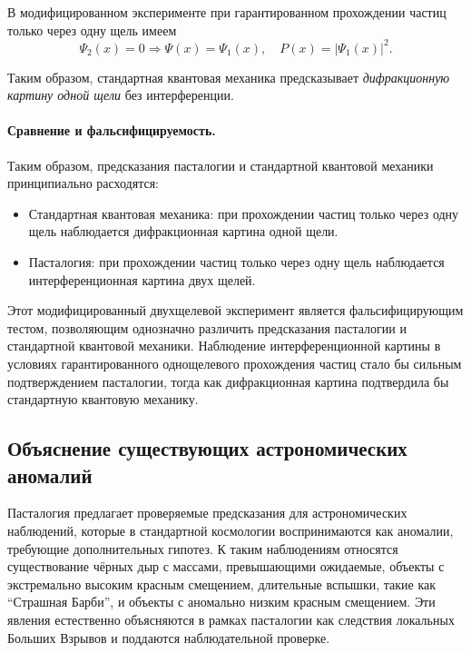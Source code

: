 \documentclass[pdflatex,sn-mathphys-num]{sn-jnl}
\begin{document}
В модифицированном эксперименте при гарантированном прохождении частиц только через одну щель имеем
\begin{equation}
    \Psi_2(x) = 0 \Rightarrow \Psi(x) = \Psi_1(x), \quad P(x) = |\Psi_1(x)|^2.
\end{equation}

Таким образом, стандартная квантовая механика предсказывает \emph{дифракционную картину одной щели} без интерференции.

\paragraph{Сравнение и фальсифицируемость.} Таким образом, предсказания пасталогии и стандартной квантовой механики принципиально расходятся:
\begin{itemize}
    \item Стандартная квантовая механика: при прохождении частиц только через одну щель наблюдается дифракционная картина одной щели.
    \item Пасталогия: при прохождении частиц только через одну щель наблюдается интерференционная картина двух щелей.
\end{itemize}
Этот модифицированный двухщелевой эксперимент является фальсифицирующим тестом, позволяющим однозначно различить предсказания пасталогии и стандартной квантовой механики. Наблюдение интерференционной картины в условиях гарантированного однощелевого прохождения частиц стало бы сильным подтверждением пасталогии, тогда как дифракционная картина подтвердила бы стандартную квантовую механику.

\subsection{Объяснение существующих астрономических аномалий}\label{subsec:astronomical-anomalies}

Пасталогия предлагает проверяемые предсказания для астрономических наблюдений, которые в стандартной космологии воспринимаются как аномалии, требующие дополнительных гипотез. К таким наблюдениям относятся существование чёрных дыр с массами, превышающими ожидаемые, объекты с экстремально высоким красным смещением, длительные вспышки, такие как ``Страшная Барби'', и объекты с аномально низким красным смещением. Эти явления естественно объясняются в рамках пасталогии как следствия локальных Больших Взрывов и поддаются наблюдательной проверке.
\end{document}
